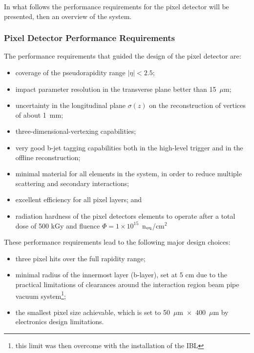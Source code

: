 In what follows the  performance requirements for the pixel detector will be presented, then 
an overview of the system.

\subsubsection{Pixel Detector Performance Requirements}
The performance requirements that guided the design of the pixel detector are:

\begin{itemize}
\item coverage of the pseudorapidity range $|\eta|<2.5$;
\item impact parameter resolution in the transverse plane better than 15~$\mu$m;
\item uncertainty in the longitudinal plane $\sigma(z)$ on the reconstruction of vertices of about 1~mm;
\item three-dimensional-vertexing capabilities;
\item very good b-jet tagging capabilities both in the high-level trigger and in the offline reconstruction; 
\item  minimal material for all elements in the system, in order to reduce multiple scattering and secondary interactions;
\item excellent efficiency for all pixel layers; and
\item radiation hardness of the pixel detectors elements to operate after a total dose of 500 kGy 
and fluence $\Phi=1\times10^{15}$~n$_{\rm eq}$/cm$^2$
\end{itemize}

These performance requirements lead to the following major design choices:

\begin{itemize}
\item three pixel hits over the full rapidity range;
\item minimal radius of the innermost layer (b-layer), set at 5 cm due to the practical limitations of clearances around the interaction region beam pipe vacuum system\footnote{this limit was then overcome with the installation of the IBL};
\item the smallest pixel size achievable, which is set to 50~$\mu$m~$\times$~400~$\mu$m by electronics design limitations.
\end{itemize}

